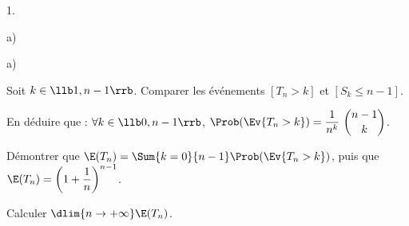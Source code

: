 \begin{noliste}{1.}
\begin{noliste}{a)}
    
  \end{noliste}


  
	
\item 
  \begin{noliste}{a)}
  \item Soit $k\in\llb 1,n-1\rrb$. Comparer les événements $[T_n>k]$
    et $[S_k\leq n-1]$.
    
    
	
  \item En déduire que : $\forall k\in\llb 0, n-1\rrb$,
    $\Prob(\Ev{T_n>k})=\dfrac{1}{n^k} \ \dbinom{n-1}{k}$.
    
    
  \end{noliste}
  



\item Démontrer que $\E(T_n)=\Sum{k=0}{n-1} \Prob(\Ev{T_n>k})$, puis
  que $\E(T_n)=\left(1+\dfrac{1}{n}\right)^{n-1}$.
  
  
  
\item Calculer $\dlim{n\to+\infty} \E(T_n)$.
  
  
\end{noliste}


